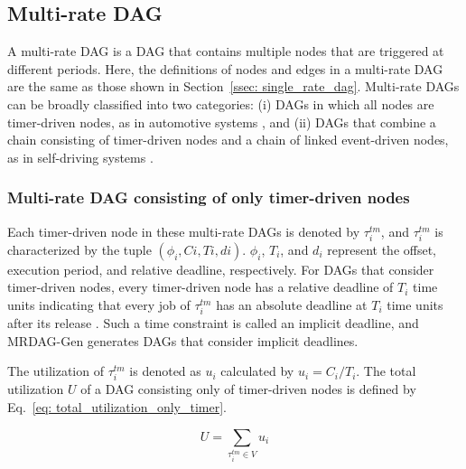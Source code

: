 \subsection{Multi-rate DAG}
\label{ssec: multi_rate_dag}

A multi-rate DAG is a DAG that contains multiple nodes that are triggered at different periods.
Here, the definitions of nodes and edges in a multi-rate DAG are the same as those shown in Section~\ref{ssec: single_rate_dag}.
Multi-rate DAGs can be broadly classified into two categories: (i) DAGs in which all nodes are timer-driven nodes, as in automotive systems \cite{kordon2020evaluation, verucchi2020latency}, and (ii) DAGs that combine a chain consisting of timer-driven nodes and a chain of linked event-driven nodes, as in self-driving systems \cite{choi2021picas, tang2020response}.


\subsubsection{Multi-rate DAG consisting of only timer-driven nodes}
\label{sssec: dag_only_timer}

Each timer-driven node in these multi-rate DAGs is denoted by $\tau^{tm}_i$, and $\tau^{tm}_i$ is characterized by the tuple $(\phi_i, Ci, Ti, di)$.
$\phi_i$, $T_i$, and $d_i$ represent the offset, execution period, and relative deadline, respectively.
For DAGs that consider timer-driven nodes, every timer-driven node has a relative deadline of $T_i$ time units indicating that every job of $\tau^{tm}_i$ has an absolute deadline at $T_i$ time units after its release \cite{yang2020mixed, cho2021conditionally}.
Such a time constraint is called an implicit deadline, and MRDAG-Gen generates DAGs that consider implicit deadlines.

The utilization of $\tau^{tm}_i$ is denoted as $u_i$ calculated by $u_i = C_i / T_i$.
The total utilization $U$ of a DAG consisting only of timer-driven nodes is defined by Eq.~\ref{eq: total_utilization_only_timer}.

\begin{equation}
    \label{eq: total_utilization_only_timer}
    U = \sum_{\tau^{tm}_i \in V}u_i
\end{equation}


